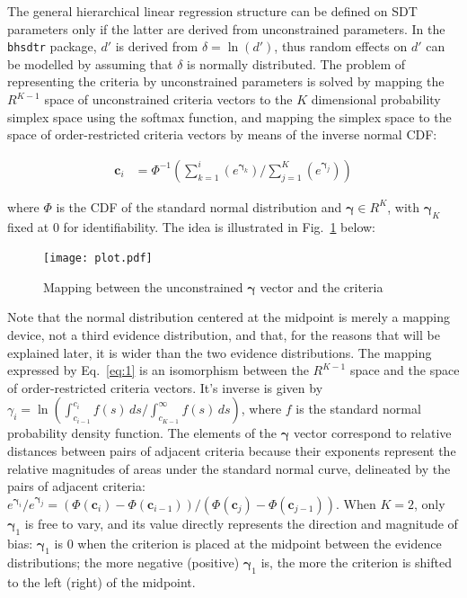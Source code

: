 \documentclass[a4paper,man,apacite,floatsintext]{apa6}
\newcommand{\code}[1]{\texttt{#1}}
\begin{document}
The general hierarchical linear regression structure can be defined on
SDT parameters only if the latter are derived from unconstrained
parameters. In the \code{bhsdtr} package, $d'$ is derived from
$\delta = \ln(d')$, thus random effects on $d'$ can be modelled by
assuming that $\delta$ is normally distributed. The problem of
representing the criteria by unconstrained parameters is solved by
mapping the $R^{K-1}$ space of unconstrained criteria vectors to the
$K$ dimensional probability simplex space using the softmax function,
and mapping the simplex space to the space of order-restricted
criteria vectors by means of the inverse normal CDF:

\begin{align}
  \bm{c}_i &= \Phi^{-1}(\sum_{k = 1}^i(e^{\bm{\gamma}_k}) /
             \sum_{j=1}^K(e^{\bm{\gamma}_j}))
\label{eq:1}
\end{align}

\noindent where $\Phi$ is the CDF of the standard normal distribution
and $\bm{\gamma} \in R^K$, with $\bm{\gamma}_K$ fixed at $0$ for
identifiability. The idea is illustrated in Fig.~\ref{fig:2} below:

\begin{figure}[H]
  \centering
  \texttt{[image: plot.pdf]}
  \caption{Mapping between the unconstrained $\bm{\gamma}$ vector and
    the criteria}
  \label{fig:2}
\end{figure}

Note that the normal distribution centered at the midpoint is merely a
mapping device, not a third evidence distribution, and that, for the
reasons that will be explained later, it is wider than the two
evidence distributions. The mapping expressed by Eq.~\ref{eq:1} is an
isomorphism between the $R^{K-1}$ space and the space of
order-restricted criteria vectors. It's inverse is given by
$\gamma_i =\ln{(\int_{c_{i-1}}^{c_i} f(s) \,ds /
  \int_{c_{K-1}}^{\infty} f(s) \, ds)}$, where $f$ is the standard
normal probability density function. The elements of the $\bm{\gamma}$
vector correspond to relative distances between pairs of adjacent
criteria because their exponents represent the relative magnitudes of
areas under the standard normal curve, delineated by the pairs of
adjacent criteria:
$e^{\bm{\gamma}_i} / e^{\bm{\gamma}_j} = (\Phi(\bm{c}_i) -
\Phi(\bm{c}_{i-1})) / (\Phi(\bm{c}_j) - \Phi(\bm{c}_{j-1}))$. When
$K=2$, only $\bm{\gamma}_1$ is free to vary, and its value directly
represents the direction and magnitude of bias: $\bm{\gamma}_1$ is $0$
when the criterion is placed at the midpoint between the evidence
distributions; the more negative (positive) $\bm{\gamma}_1$ is, the
more the criterion is shifted to the left (right) of the midpoint.
\end{document}
